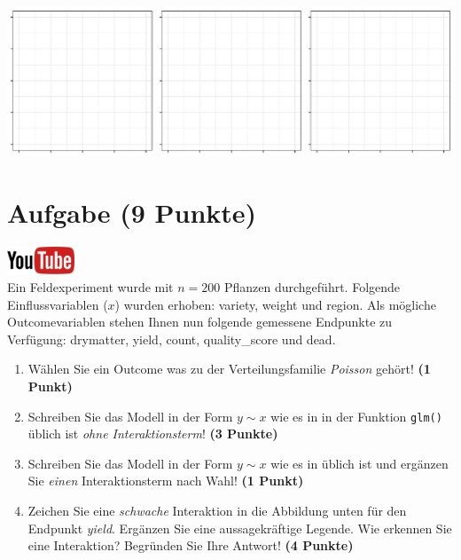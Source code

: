 \documentclass[a4paper, 10pt]{scrartcl}\usepackage[]{graphicx}\usepackage[]{xcolor}
\makeatletter
\def\maxwidth{ %
  \ifdim\Gin@nat@width>\linewidth
    \linewidth
  \else
    \Gin@nat@width
  \fi
}
\makeatother
\begin{document}
{\centering \includegraphics[width=\maxwidth]{img/regression-01-1} 

}



 
\clearpage

\section{Aufgabe \hfill (9 Punkte)}

\hfill\href{https://youtu.be/AwQEcQWLFCw}{\includegraphics[width =
  2cm]{img/youtube}}\\[1Ex]



Ein Feldexperiment wurde mit $n = 200$ Pflanzen durchgef{\"u}hrt. Folgende
Einflussvariablen ($x$) wurden erhoben: variety, weight und region. Als m{\"o}gliche Outcomevariablen stehen Ihnen nun
folgende gemessene Endpunkte zu Verf{\"u}gung: drymatter, yield, count, quality\_score und dead.

\begin{enumerate}
\item W{\"a}hlen Sie ein Outcome was zu der Verteilungsfamilie
  \textit{Poisson} geh{\"o}rt! \textbf{(1 Punkt)}
\item Schreiben Sie das Modell in der Form $y \sim x$ wie es in \Rlogo in
  der Funktion \texttt{glm()}
  {\"u}blich ist \textit{ohne Interaktionsterm}! \textbf{(3 Punkte)}
\item Schreiben Sie das Modell in der Form $y \sim x$ wie es in \Rlogo
  {\"u}blich ist und erg{\"a}nzen Sie \textit{einen} Interaktionsterm nach Wahl! \textbf{(1 Punkt)} 
\item Zeichen Sie eine \textit{schwache}
  Interaktion in die Abbildung unten f{\"u}r den Endpunkt
  \textit{yield}. Erg{\"a}nzen Sie eine aussagekr{\"a}ftige Legende. Wie erkennen
  Sie eine Interaktion? Begr{\"u}nden Sie Ihre Antwort! \textbf{(4 Punkte)}
\end{enumerate}
\end{document}
